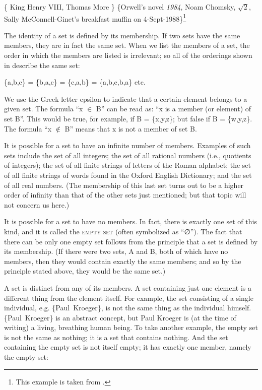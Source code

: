 \ea \label{ex:13.2}
\ea \{ King Henry VIII, Thomas More \}
\ex  \{Orwell’s novel \textit{1984}, Noam Chomsky, $\sqrt{2}$, Sally McConnell-Ginet’s breakfast muffin on 4-Sept-1988\}\footnote{This example is taken from \citet[431]{CherchiaMcConnell-Ginet1990}.}
\z
\z


The identity of a set is defined by its membership. If two sets have the same members, they are in fact the same set. When we list the members of a set, the order in which the members are listed is irrelevant; so all of the orderings shown in  describe the same set:


\ea \label{ex:13.3}
\{a,b,c\} = \{b,a,c\} = \{c,a,b\} = \{a,b,c,b,a\} etc. 
\z


We use the Greek letter epsilon to indicate that a certain element belongs to a given set. The formula “x ${\in}$ B” can be read as: “x is a member (or element) of set B”. This would be true, for example, if B = \{x,y,z\}; but false if B = \{w,y,z\}. The formula “x ${\notin}$ B” means that x is not a member of set B.



It is possible for a set to have an infinite number of members. Examples of such sets include the set of all integers; the set of all rational numbers (i.e., quotients of integers); the set of all finite strings of letters of the Roman alphabet; the set of all finite strings of words found in the Oxford English Dictionary; and the set of all real numbers. (The membership of this last set turns out to be a higher order of infinity than that of the other sets just mentioned; but that topic will not concern us here.)



It is possible for a set to have no members. In fact, there is exactly one set of this kind, and it is called the \textsc{empty set} (often symbolized as “∅”). The fact that there can be only one empty set follows from the principle that a set is defined by its membership. (If there were two sets, A and B, both of which have no members, then they would contain exactly the same members; and so by the principle stated above, they would be the same set.)



A set is distinct from any of its members. A set containing just one element is a different thing from the element itself. For example, the set consisting of a single individual, e.g. \{Paul~Kroeger\}, is not the same thing as the individual himself. \{Paul~Kroeger\} is an abstract concept, but Paul Kroeger is (at the time of writing) a living, breathing human being. To take another example, the empty set is not the same as nothing; it is a set that contains nothing. And the set containing the empty set is not itself empty; it has exactly one member, namely the empty set:


